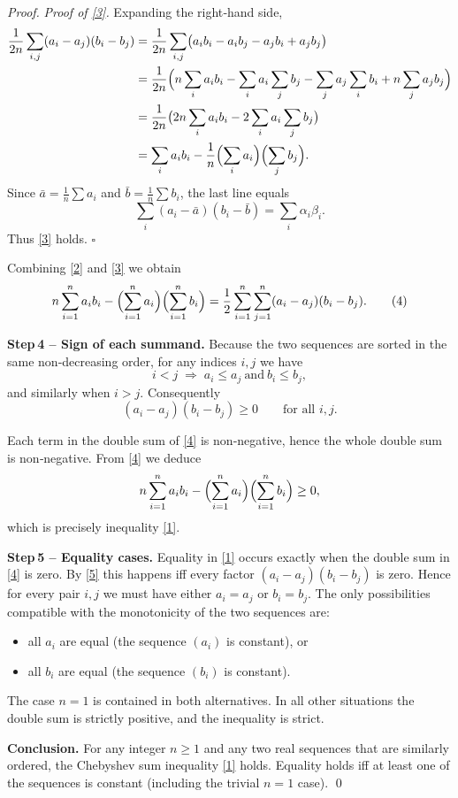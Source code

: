 \begin{proof}
\emph{Proof of \eqref{3}.}  
Expanding the right‑hand side,
\begin{align*}
\frac{1}{2n}\sum_{i,j}(a_i-a_j)(b_i-b_j)
&=\frac{1}{2n}\sum_{i,j}
   \bigl(a_i b_i - a_i b_j - a_j b_i + a_j b_j\bigr)  \\
&=\frac{1}{2n}
   \Bigl(
        n\sum_{i}a_i b_i
        -\sum_{i}a_i\sum_{j}b_j
        -\sum_{j}a_j\sum_{i}b_i
        + n\sum_{j}a_j b_j
   \Bigr)                                              \\
&=\frac{1}{2n}\bigl(2n\sum_{i}a_i b_i-2\sum_{i}a_i\sum_{j}b_j\bigr)\\
&=\sum_{i}a_i b_i-\frac{1}{n}\Bigl(\sum_{i}a_i\Bigr)\Bigl(\sum_{j}b_j\Bigr).
\end{align*}
Since $\bar a=\frac1n\sum a_i$ and $\bar b=\frac1n\sum b_i$, the last line equals
\[
\sum_{i}(a_i-\bar a)(b_i-\bar b)=\sum_{i}\alpha_i\beta_i .
\]
Thus \eqref{3} holds. \hfill$\square$

Combining \eqref{2} and \eqref{3} we obtain
\[
n\sum_{i=1}^{n}a_i b_i-
\Bigl(\sum_{i=1}^{n}a_i\Bigr)\Bigl(\sum_{i=1}^{n}b_i\Bigr)
= \frac{1}{2}\sum_{i=1}^{n}\sum_{j=1}^{n}
   (a_i-a_j)(b_i-b_j). \tag{4}
\]

\medskip
\textbf{Step 4 – Sign of each summand.}  
Because the two sequences are sorted in the same non‑decreasing order, for any indices $i,j$ we have
\[
i<j\;\Longrightarrow\; a_i\le a_j\ \text{and}\ b_i\le b_j,
\]
and similarly when $i>j$.  Consequently
\[
(a_i-a_j)(b_i-b_j)\ge 0\qquad\text{for all }i,j. \tag{5}
\]

Each term in the double sum of \eqref{4} is non‑negative, hence the whole double sum is non‑negative.  From \eqref{4} we deduce
\[
n\sum_{i=1}^{n}a_i b_i-
\Bigl(\sum_{i=1}^{n}a_i\Bigr)\Bigl(\sum_{i=1}^{n}b_i\Bigr)\ge0,
\]
which is precisely inequality \eqref{1}.

\medskip
\textbf{Step 5 – Equality cases.}  
Equality in \eqref{1} occurs exactly when the double sum in \eqref{4} is zero.  By \eqref{5} this happens iff every factor $(a_i-a_j)(b_i-b_j)$ is zero.  Hence for every pair $i,j$ we must have either $a_i=a_j$ or $b_i=b_j$.  The only possibilities compatible with the monotonicity of the two sequences are:

\begin{itemize}
\item all $a_i$ are equal (the sequence $(a_i)$ is constant), or
\item all $b_i$ are equal (the sequence $(b_i)$ is constant).
\end{itemize}
The case $n=1$ is contained in both alternatives.  In all other situations the double sum is strictly positive, and the inequality is strict.

\medskip
\textbf{Conclusion.}  
For any integer $n\ge1$ and any two real sequences that are similarly ordered, the Chebyshev sum inequality \eqref{1} holds.  Equality holds iff at least one of the sequences is constant (including the trivial $n=1$ case). \qed
\end{proof}